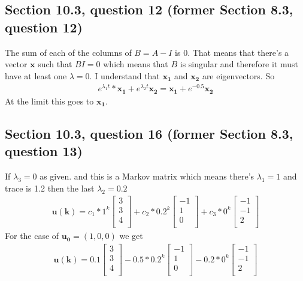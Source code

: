 \documentclass[a4paper,11pt]{article}
\newcommand{\mybf}[1]{\boldsymbol{#1}}
\begin{document}
\subsection*{Section 10.3, question 12 (former Section 8.3, question 12)}
The sum of each of the columns of $B=A-I$ is 0. That means that there's a vector $\mybf{x}$ such that $B{I}=0$ which means that $B$ is singular and therefore it must have at least one $\lambda=0$.
I understand that $\mybf{x_1}$ and $\mybf{x_2}$ are eigenvectors. So 
\begin{align*}
e^{\lambda_1{t}}*\mybf{x_1}+e^{\lambda_2{t}}\mybf{x_2}=\mybf{x_1}+e^{-0.5}\mybf{x_2}
\end{align*}
At the limit this goes to $\mybf{x_1}$.
\subsection*{Section 10.3, question 16 (former Section 8.3, question 13)}
If $\lambda_3=0$ as given. and this is a Markov matrix which means there's $\lambda_1=1$ and trace is 1.2 then the last $\lambda_2=0.2$
\begin{align*}
\mybf{u(k)} = 
{c_1}*1^k
\begin{bmatrix}
3 \\
3 \\
4 \\
\end{bmatrix}
+
{c_2}*{0.2}^k
\begin{bmatrix}
-1 \\
1 \\
0 \\
\end{bmatrix}
+
{c_3}*0^k
\begin{bmatrix}
-1 \\
-1 \\
2 \\
\end{bmatrix}
\end{align*}
For the case of $\mybf{u_0}=(1,0,0)$ we get
\begin{align*}
\mybf{u(k)} = 
0.1
\begin{bmatrix}
3 \\
3 \\
4 \\
\end{bmatrix}
-0.5*{0.2}^k
\begin{bmatrix}
-1 \\
1 \\
0 \\
\end{bmatrix}
-
0.2*{0}^k
\begin{bmatrix}
-1 \\
-1 \\
2 \\
\end{bmatrix}
\end{align*}
\end{document}
